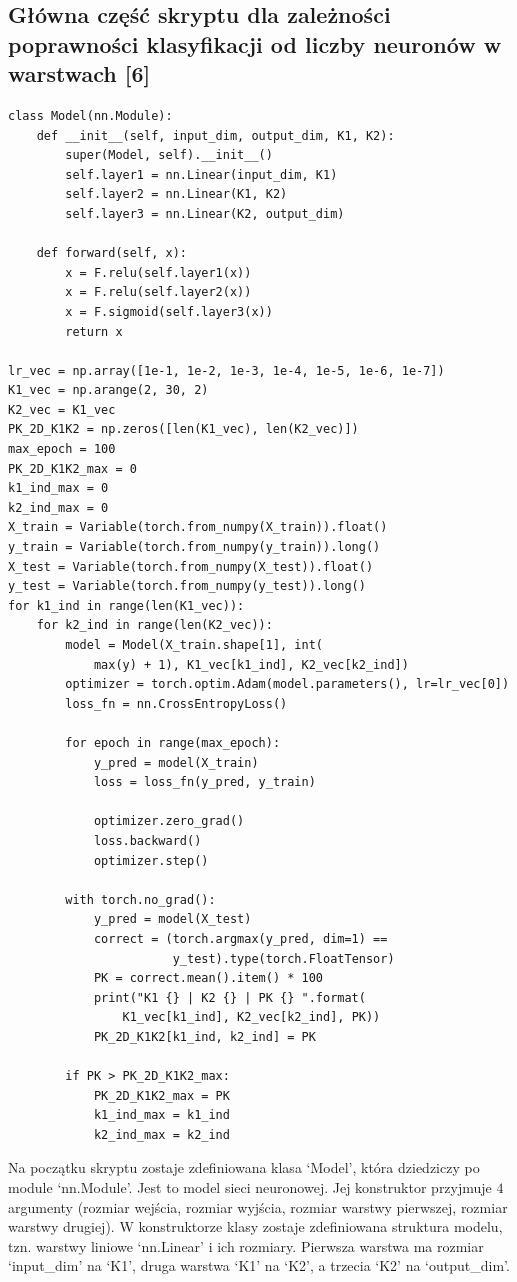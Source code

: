 \documentclass[a4paper]{article}
\begin{document}
\subsection{Główna część skryptu dla zależności poprawności klasyfikacji od liczby neuronów w warstwach [6]}
\begin{verbatim}
class Model(nn.Module):
    def __init__(self, input_dim, output_dim, K1, K2):
        super(Model, self).__init__()
        self.layer1 = nn.Linear(input_dim, K1)
        self.layer2 = nn.Linear(K1, K2)
        self.layer3 = nn.Linear(K2, output_dim)

    def forward(self, x):
        x = F.relu(self.layer1(x))
        x = F.relu(self.layer2(x))
        x = F.sigmoid(self.layer3(x))
        return x

lr_vec = np.array([1e-1, 1e-2, 1e-3, 1e-4, 1e-5, 1e-6, 1e-7])
K1_vec = np.arange(2, 30, 2)
K2_vec = K1_vec
PK_2D_K1K2 = np.zeros([len(K1_vec), len(K2_vec)])
max_epoch = 100
PK_2D_K1K2_max = 0
k1_ind_max = 0
k2_ind_max = 0
X_train = Variable(torch.from_numpy(X_train)).float()
y_train = Variable(torch.from_numpy(y_train)).long()
X_test = Variable(torch.from_numpy(X_test)).float()
y_test = Variable(torch.from_numpy(y_test)).long()
for k1_ind in range(len(K1_vec)):
    for k2_ind in range(len(K2_vec)):
        model = Model(X_train.shape[1], int(
            max(y) + 1), K1_vec[k1_ind], K2_vec[k2_ind])
        optimizer = torch.optim.Adam(model.parameters(), lr=lr_vec[0])
        loss_fn = nn.CrossEntropyLoss()

        for epoch in range(max_epoch):
            y_pred = model(X_train)
            loss = loss_fn(y_pred, y_train)

            optimizer.zero_grad()
            loss.backward()
            optimizer.step()

        with torch.no_grad():
            y_pred = model(X_test)
            correct = (torch.argmax(y_pred, dim=1) ==
                       y_test).type(torch.FloatTensor)
            PK = correct.mean().item() * 100
            print("K1 {} | K2 {} | PK {} ".format(
                K1_vec[k1_ind], K2_vec[k2_ind], PK))
            PK_2D_K1K2[k1_ind, k2_ind] = PK

        if PK > PK_2D_K1K2_max:
            PK_2D_K1K2_max = PK
            k1_ind_max = k1_ind
            k2_ind_max = k2_ind
\end{verbatim}

Na początku skryptu zostaje zdefiniowana klasa `Model', która dziedziczy po module `nn.Module'.
Jest to model sieci neuronowej.
Jej konstruktor przyjmuje $4$ argumenty (rozmiar wejścia, rozmiar wyjścia, rozmiar warstwy pierwszej, rozmiar warstwy drugiej).
W konstruktorze klasy zostaje zdefiniowana struktura modelu, tzn. warstwy liniowe `nn.Linear' i ich rozmiary.
Pierwsza warstwa ma rozmiar `input\_dim' na `K1', druga warstwa `K1' na `K2', a trzecia `K2' na `output\_dim'.
\end{document}
